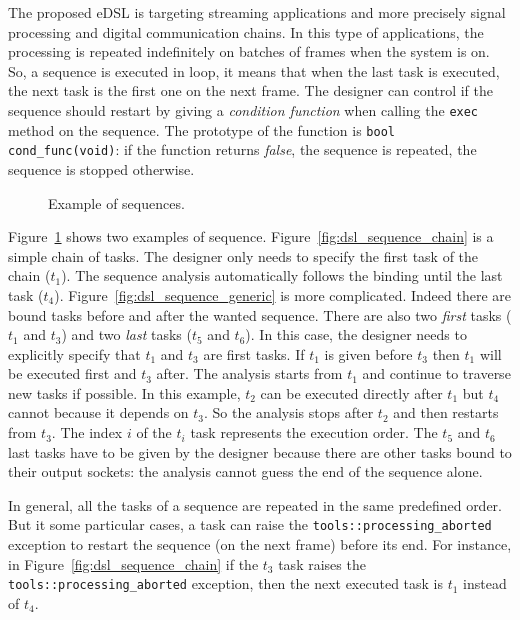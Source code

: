 The proposed eDSL is targeting streaming applications and more precisely signal
processing and digital communication chains. In this type of applications, the
processing is repeated indefinitely on batches of frames when the system is on.
So, a sequence is executed in loop, it means that when the last task is
executed, the next task is the first one on the next frame. The designer can
control if the sequence should restart by giving a \emph{condition function}
when calling the \verb|exec| method on the sequence. The prototype of the
function is \verb|bool cond_func(void)|: if the function returns \emph{false},
the sequence is repeated, the sequence is stopped otherwise.

\begin{figure}[htp]
  \centering
  \quad
  \caption{Example of sequences.}
  \label{fig:dsl_sequence}
\end{figure}

Figure~\ref{fig:dsl_sequence} shows two examples of sequence.
Figure~\ref{fig:dsl_sequence_chain} is a simple chain of tasks. The designer
only needs to specify the first task of the chain ($t_1$). The sequence analysis
automatically follows the binding until the last task ($t_4$).
Figure~\ref{fig:dsl_sequence_generic} is more complicated. Indeed there are
bound tasks before and after the wanted sequence. There are also two
\emph{first} tasks ($t_1$ and $t_3$) and two \emph{last} tasks ($t_5$ and
$t_6$). In this case, the designer needs to explicitly specify that $t_1$ and
$t_3$ are first tasks. If $t_1$ is given before $t_3$ then $t_1$ will be
executed first and $t_3$ after. The analysis starts from $t_1$ and continue to
traverse new tasks if possible. In this example, $t_2$ can be executed directly
after $t_1$ but $t_4$ cannot because it depends on $t_3$. So the analysis stops
after $t_2$ and then restarts from $t_3$. The index $i$ of the $t_i$ task
represents the execution order. The $t_5$ and $t_6$ last tasks have to be given
by the designer because there are other tasks bound to their output sockets: the
analysis cannot guess the end of the sequence alone.

In general, all the tasks of a sequence are repeated in the same predefined
order. But it some particular cases, a task can raise the
\verb|tools::processing_aborted| exception to restart the sequence (on the next
frame) before its end. For instance, in Figure~\ref{fig:dsl_sequence_chain} if
the $t_3$ task raises the \verb|tools::processing_aborted| exception, then the
next executed task is $t_1$ instead of $t_4$.

